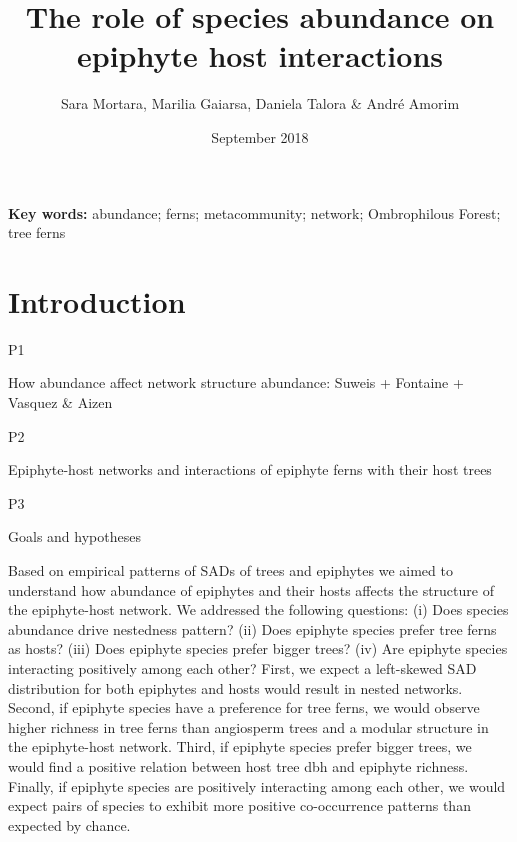 \documentclass{article}
\title{The role of species abundance on epiphyte
host interactions}
\author{Sara Mortara, Marilia Gaiarsa, Daniela Talora & André Amorim}
\date{September 2018}
\begin{document}
\maketitle

\begin{abstract}
    
\end{abstract}

\textbf{Key words:} abundance; ferns; metacommunity; network; Ombrophilous Forest; tree ferns


\section*{Introduction}





P1

How abundance affect network structure
abundance: Suweis + Fontaine + Vasquez & Aizen

P2

Epiphyte-host networks and interactions of epiphyte ferns with their host trees

P3

Goals and hypotheses

Based on empirical patterns of SADs of trees and epiphytes we aimed to understand how abundance of epiphytes and their hosts affects the structure of the epiphyte-host network. We addressed the following questions: (i) Does species abundance drive nestedness pattern? (ii) Does epiphyte species prefer tree ferns as hosts? (iii) Does epiphyte species prefer bigger trees? (iv) Are epiphyte species interacting positively among each other? First, we expect a left-skewed SAD distribution for both epiphytes and hosts would result in nested networks. Second, if epiphyte species have a preference for tree ferns, we would observe higher richness in tree ferns than angiosperm trees and a modular structure in the epiphyte-host network. Third, if epiphyte species prefer bigger trees, we would find a positive relation between host tree dbh and epiphyte richness. Finally, if epiphyte species are positively interacting among each other, we would expect pairs of species to exhibit more positive co-occurrence patterns than expected by chance.
\end{document}

